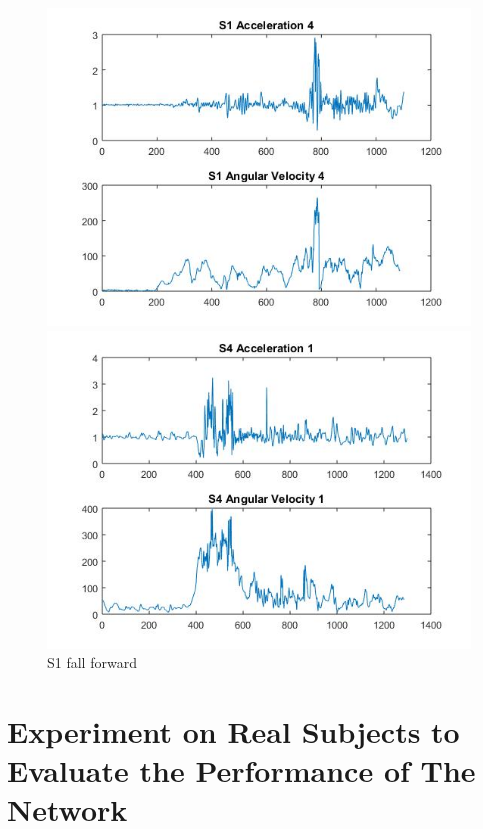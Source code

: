 \documentclass[letterpaper,12pt,titlepage,oneside,final]{book}
\let\origdoublepage\cleardoublepage
\newcommand{\clearemptydoublepage}{%
	\clearpage{\pagestyle{empty}\origdoublepage}}
\let\cleardoublepage\clearemptydoublepage
\begin{document}
    
\begin{figure}
	\centering
	\hspace{-2.5cm}
	\begin{minipage}[b]{0.5\linewidth}
		\centering
		\includegraphics[scale=0.5]{hieu4}
	\end{minipage}%
	\hspace{1cm}
	\begin{minipage}[b]{0.5\linewidth}
		\centering
		\includegraphics[scale=0.5]{phuc1}
	\end{minipage}	
	\caption{S1 fall forward}
\end{figure}
\cleardoublepage
\section{Experiment on Real Subjects to Evaluate the Performance of The Network}
\end{document}
